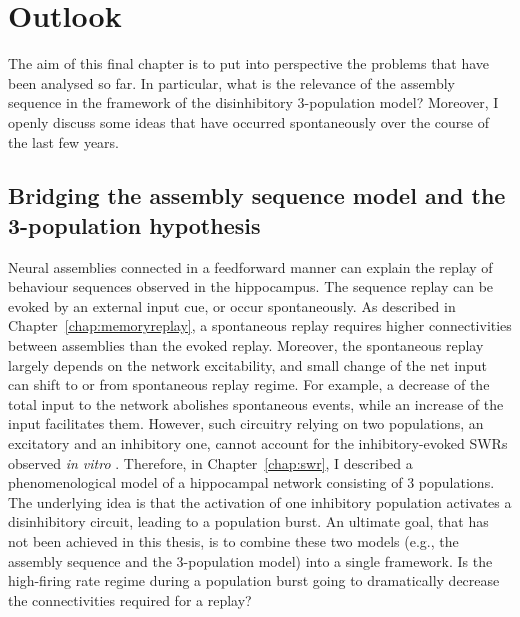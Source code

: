 \chapter{Outlook}
  The aim of this final chapter is to put into perspective the problems that
  have been analysed so far. In particular, what is the relevance of the
  assembly sequence in the framework of the disinhibitory 3-population model?
  Moreover, I openly discuss some ideas that have occurred spontaneously over
  the course of the last few years.

\section{Bridging the assembly sequence model and the 3-population hypothesis}
  Neural assemblies connected in a feedforward manner can explain the replay of
  behaviour sequences observed in the hippocampus. The sequence replay can be
  evoked by an external input cue, or occur spontaneously. As described in
  Chapter~\ref{chap:memoryreplay}, a spontaneous replay requires higher
  connectivities between assemblies than the evoked replay. Moreover, the
  spontaneous replay largely depends on the network excitability, and small
  change of the net input can shift to or from spontaneous replay regime. For
  example, a decrease of the total input to the network abolishes spontaneous
  events, while an increase of the input facilitates them. However, such
  circuitry relying on two populations, an excitatory and an inhibitory one,
  cannot account for the inhibitory-evoked SWRs observed \textit{in vitro}
  \citep[e.g.,][]{Schlingloff2014, Kohus2016}. Therefore, in
  Chapter~\ref{chap:swr}, I described a phenomenological model of a hippocampal
  network consisting of 3 populations. The underlying idea is that the
  activation of one inhibitory population activates a disinhibitory circuit,
  leading to a population burst. An ultimate goal, that has not been achieved
  in this thesis, is to combine these two models (e.g., the assembly sequence
  and the 3-population model) into a single framework. Is the high-firing rate
  regime during a population burst going to dramatically decrease the
  connectivities required for a replay?

